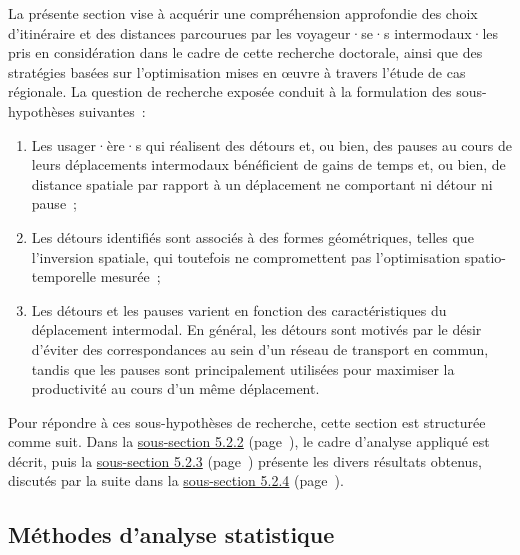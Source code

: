 \begin{refsegment}
La présente section vise à acquérir une compréhension approfondie des choix d'itinéraire et des distances parcourues par les voyageur·se·s intermodaux·les pris en considération dans le cadre de cette recherche doctorale, ainsi que des stratégies basées sur l'optimisation mises en œuvre à travers l'étude de cas régionale. La question de recherche exposée conduit à la formulation des sous-hypothèses suivantes~:
\begin{enumerate}
    \item Les usager·ère·s qui réalisent des détours et, ou bien, des pauses au cours de leurs déplacements intermodaux bénéficient de gains de temps et, ou bien, de distance spatiale par rapport à un déplacement ne comportant ni détour ni pause~;
    \item Les détours identifiés sont associés à des formes géométriques, telles que l'inversion spatiale, qui toutefois ne compromettent pas l'optimisation spatio-temporelle mesurée~;
    \item Les détours et les pauses varient en fonction des caractéristiques du déplacement intermodal. En général, les détours sont motivés par le désir d'éviter des correspondances au sein d'un réseau de transport en commun, tandis que les pauses sont principalement utilisées pour maximiser la productivité au cours d'un même déplacement.
\end{enumerate}%

Pour répondre à ces sous-hypothèses de recherche, cette section est structurée comme suit. Dans la \hyperref[chap5:methodes-statistiques]{sous-section 5.2.2} (page~\pageref{chap5:methodes-statistiques}), le cadre d'analyse appliqué est décrit, puis la \hyperref[chap5:strategies-optimisation]{sous-section 5.2.3} (page~\pageref{chap5:strategies-optimisation}) présente les divers résultats obtenus, discutés par la suite dans la \hyperref[chap5:discussion-detours-pauses-optimisation]{sous-section 5.2.4} (page~\pageref{chap5:discussion-detours-pauses-optimisation}).%

\subsection{Méthodes d'analyse statistique
    \label{chap5:methodes-statistiques}
    }


\end{refsegment}
